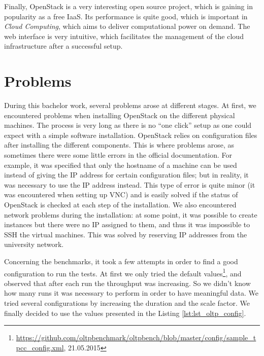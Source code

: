 Finally, OpenStack is a very interesting open source project, which is gaining in popularity as a free IaaS.
Its performance is quite good, which is important in \textit{Cloud Computing}, which aims to deliver computational power on demand.
The web interface is very intuitive, which facilitates the management of the cloud infrastructure after a successful setup.







\section{Problems}
During this bachelor work, several problems arose at different stages. 
At first, we encountered problems when installing OpenStack on the different physical machines.
The process is very long as there is no ``one click'' setup as one could expect with a simple software installation.
OpenStack relies on configuration files after installing the different components.
This is where problems arose, as sometimes there were some little errors in the official documentation.
For example, it was specified that only the hostname of a machine can be used instead of giving the IP address for certain configuration files; but in reality, it was necessary to use the IP address instead. 
This type of error is quite minor (it was encountered when setting up VNC) and is easily solved if the status of OpenStack is checked at each step of the installation.
We also encountered network problems during the installation: at some point, it was possible to create instances but there were no IP assigned to them, and thus it was impossible to SSH the virtual machines.
This was solved by reserving IP addresses from the university network.

Concerning the benchmarks, it took a few attempts in order to find a good configuration to run the tests.
At first we only tried the default values\footnote{\url{https://github.com/oltpbenchmark/oltpbench/blob/master/config/sample_tpcc_config.xml}, 21.05.2015}, and observed that after each run the throughput was increasing.
So we didn't know how many runs it was necessary to perform in order to have meaningful data.
We tried several configurations by increasing the duration and the scale factor.
We finally decided to use the values presented in the Listing \ref{lst:lst_oltp_config}.


